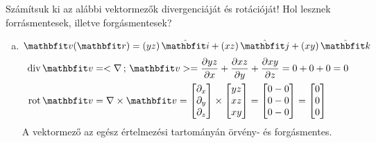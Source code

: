 \documentclass[exercise]{math-standalone}
\begin{document}
\begin{exercise}{%
    Számítsuk ki az alábbi vektormezők divergenciáját és rotációját!
    Hol lesznek forrásmentesek, illetve forgásmentesek?
  }
{\begin{enumerate}[a)]
      \item $\rvec v(\rvec r) = (yz) \,\uvec i + (xz) \,\uvec j + (xy) \,\uvec k$
            \begin{align*}
              \Div \rvec v
               & = \scalar{\nabla}{\rvec v}
              = \pdv{yz}{x} + \pdv{xz}{y} + \pdv{xy}{z}
              = 0 + 0 + 0
              = 0
              \\
              \rot \rvec v
               & = \nabla \times \rvec v
              = \begin{bmatrix}
                  \partial_x \\ \partial_y \\ \partial_z
                \end{bmatrix} \times \begin{bmatrix}
                                       yz \\ xz \\ xy
                                     \end{bmatrix} = \begin{bmatrix}
                                                       0 - 0 \\ 0 - 0 \\ 0 - 0
                                                     \end{bmatrix} = \begin{bmatrix}
                                                                       0 \\ 0 \\ 0
                                                                     \end{bmatrix}
            \end{align*}
            A vektormező az egész értelmezési tartományán örvény- és
            forgásmentes.


\end{enumerate}}
\end{exercise}
\end{document}
